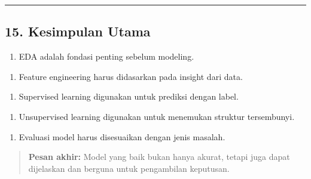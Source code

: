 \documentclass[12pt,a4paper]{article}
\begin{document}
\hrule


\subsection{15. Kesimpulan Utama}

\begin{enumerate}
\item EDA adalah fondasi penting sebelum modeling.
\end{enumerate}

\begin{enumerate}
\item Feature engineering harus didasarkan pada insight dari data.
\end{enumerate}

\begin{enumerate}
\item Supervised learning digunakan untuk prediksi dengan label.
\end{enumerate}

\begin{enumerate}
\item Unsupervised learning digunakan untuk menemukan struktur tersembunyi.
\end{enumerate}

\begin{enumerate}
\item Evaluasi model harus disesuaikan dengan jenis masalah.
\end{enumerate}


\begin{quote}
\textbf{Pesan akhir:} Model yang baik bukan hanya akurat, tetapi juga dapat dijelaskan dan berguna untuk pengambilan keputusan.\end{quote}
\end{document}
